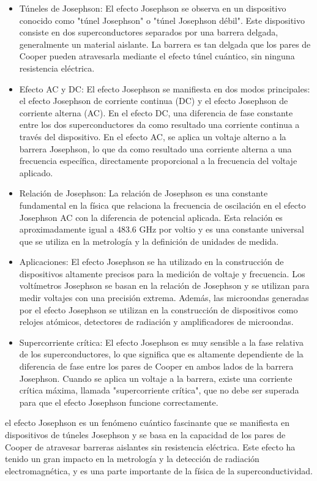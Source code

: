 \documentclass[10.5pt]{article}
\begin{document}
    \begin{itemize}
        \item Túneles de Josephson: El efecto Josephson se observa en un dispositivo conocido como "túnel Josephson" o "túnel Josephson débil". Este dispositivo consiste en dos superconductores separados por una barrera delgada, generalmente un material aislante. La barrera es tan delgada que los pares de Cooper pueden atravesarla mediante el efecto túnel cuántico, sin ninguna resistencia eléctrica.
        \item Efecto AC y DC: El efecto Josephson se manifiesta en dos modos principales: el efecto Josephson de corriente continua (DC) y el efecto Josephson de corriente alterna (AC). En el efecto DC, una diferencia de fase constante entre los dos superconductores da como resultado una corriente continua a través del dispositivo. En el efecto AC, se aplica un voltaje alterno a la barrera Josephson, lo que da como resultado una corriente alterna a una frecuencia específica, directamente proporcional a la frecuencia del voltaje aplicado.
        \item Relación de Josephson: La relación de Josephson es una constante fundamental en la física que relaciona la frecuencia de oscilación en el efecto Josephson AC con la diferencia de potencial aplicada. Esta relación es aproximadamente igual a 483.6 GHz por voltio y es una constante universal que se utiliza en la metrología y la definición de unidades de medida.
        \item Aplicaciones: El efecto Josephson se ha utilizado en la construcción de dispositivos altamente precisos para la medición de voltaje y frecuencia. Los voltímetros Josephson se basan en la relación de Josephson y se utilizan para medir voltajes con una precisión extrema. Además, las microondas generadas por el efecto Josephson se utilizan en la construcción de dispositivos como relojes atómicos, detectores de radiación y amplificadores de microondas.
        \item Supercorriente crítica: El efecto Josephson es muy sensible a la fase relativa de los superconductores, lo que significa que es altamente dependiente de la diferencia de fase entre los pares de Cooper en ambos lados de la barrera Josephson. Cuando se aplica un voltaje a la barrera, existe una corriente crítica máxima, llamada "supercorriente crítica", que no debe ser superada para que el efecto Josephson funcione correctamente.
    \end{itemize}
    el efecto Josephson es un fenómeno cuántico fascinante que se manifiesta en dispositivos de túneles Josephson y se basa en la capacidad de los pares de Cooper de atravesar barreras aislantes sin resistencia eléctrica. Este efecto ha tenido un gran impacto en la metrología y la detección de radiación electromagnética, y es una parte importante de la física de la superconductividad.
    \pagebreak
\end{document}
